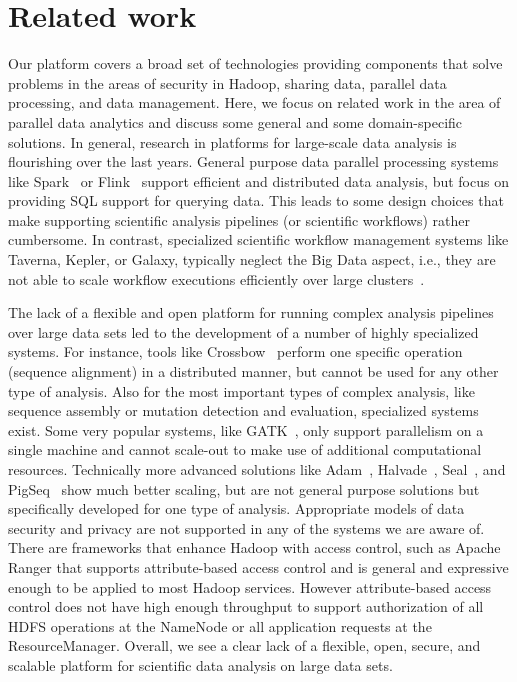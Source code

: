 \section{Related work}

Our platform covers a broad set of technologies providing components that solve problems in the areas of security in Hadoop, sharing data, parallel data processing, and data management. Here, we focus on related work in the area of parallel data analytics and discuss some general and some domain-specific solutions. In general, research in platforms for large-scale data analysis is flourishing over the last years. General purpose data parallel processing systems like Spark~\cite{Zaharia2010} or Flink~\cite{flink15} support efficient and distributed data analysis, but focus on providing SQL support for querying data. This leads to some design choices that make supporting scientific analysis pipelines (or scientific workflows) rather cumbersome. In contrast, specialized scientific workflow management systems like Taverna, Kepler, or Galaxy, typically neglect the Big Data aspect, i.e., they are not able to scale workflow executions efficiently over large clusters~\cite{Bux2013}. 

The lack of a flexible and open platform for running complex analysis pipelines over large data sets led to the development of a number of highly specialized systems. For instance, tools like Crossbow~\cite{Langmead2009b} perform one specific operation (sequence alignment) in a distributed manner, but cannot be used for any other type of analysis. Also for the most important types of complex analysis, like sequence assembly or mutation detection and evaluation, specialized systems exist. Some very popular systems, like GATK~\cite{McKenna2010}, only support parallelism on a single machine and cannot scale-out to make use of additional computational resources. Technically more advanced solutions like Adam~\cite{adam15}, Halvade~\cite{halvade15}, Seal~\cite{seal11}, and PigSeq~\cite{seqpig14} show much better scaling, but are not general purpose solutions but specifically developed for one type of analysis. Appropriate models of data security and privacy are not supported in any of the systems we are aware of. There are frameworks that enhance Hadoop with access control, such as Apache Ranger that supports attribute-based access control and is general and expressive enough to be applied to most Hadoop services. However attribute-based access control does not have high enough throughput to support authorization of all HDFS operations at the NameNode or all application requests at the ResourceManager. Overall, we see a clear lack of a flexible, open, secure, and scalable platform for scientific data analysis on large data sets.
